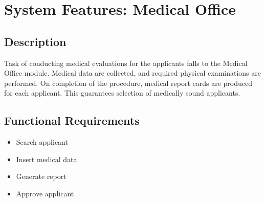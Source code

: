 \section{System Features: Medical Office}

\subsection{Description}
Task of conducting medical evaluations for the applicants falls to the Medical Office module.
Medical data are collected, and required physical examinations are performed.
On completion of the procedure, medical report cards are produced for each applicant.
This guarantees selection of medically sound applicants.

\subsection{Functional Requirements}


\begin{itemize}
    \item Search applicant
    \item Insert medical data
    \item Generate report
    \item Approve applicant
\end{itemize}